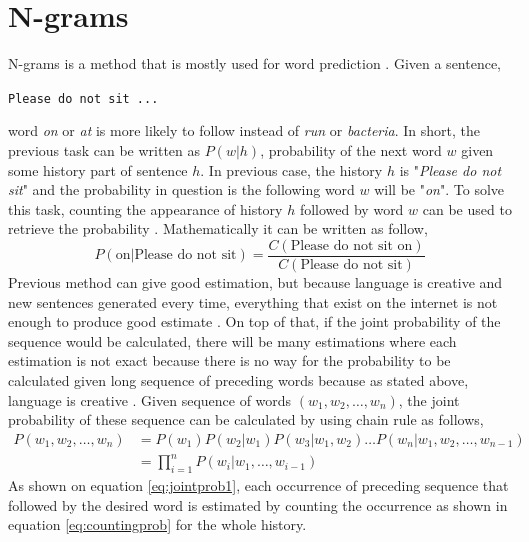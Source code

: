 \section{N-grams}
    N-grams is a method that is mostly used for word prediction
    \citep{speech2009Jurafsky:2009:SLP:1214993}. Given a sentence,
    \begin{center}
        \texttt{Please do not sit ...}
    \end{center}
    word \textit{on} or \textit{at} is more likely to follow instead
    of \textit{run} or \textit{bacteria}. In short, the previous task
    can be written as $P(w\vert h)$, probability of the next word $w$
    given some history part of sentence $h$. In previous case, the
    history $h$ is "\textit{Please do not sit}" and the probability in
    question is the following word $w$ will be "\textit{on}". To solve
    this task, counting the appearance of history $h$ followed by word
    $w$ can be used to retrieve the probability
    \citep{speech2009Jurafsky:2009:SLP:1214993}. Mathematically it can
    be written as follow,
    \begin{equation*}
        \label{eq:countingprob}
        P(\text{on} \vert \text{Please do not sit}) = 
        \frac{C(\text{Please do not sit on})}{C(\text{Please do not sit})}
    \end{equation*}
    Previous method can give good estimation, but because language is
    creative and new sentences generated every time, everything that
    exist on the internet is not enough to produce good estimate
    \citep{speech2009Jurafsky:2009:SLP:1214993}. On top of that, if
    the joint probability of the sequence would be calculated, there
    will be many estimations where each estimation is not exact
    because there is no way for the probability to be calculated given
    long sequence of preceding words because as stated above,
    language is creative
    \citep{speech2009Jurafsky:2009:SLP:1214993}. Given sequence of
    words $(w_1, w_2, \dots, w_n)$, the joint probability of these
    sequence can be calculated by using chain rule as follows,
    \begin{align}
        \label{eq:jointprob1}
        P(w_1, w_2, \dots, w_n) &= P(w_1)P(w_2 \vert w_1)P(w_3 \vert w_1, w_2) \dots
        P(w_n \vert w_1, w_2, \dots, w_{n-1}) \\
        \label{eq:jointprob2}
        &= \prod_{i=1}^n P(w_i \vert w_1, \dots, w_{i-1})
    \end{align}
    As shown on equation \ref{eq:jointprob1}, each occurrence of
    preceding sequence that followed by the desired word is estimated
    by counting the occurrence as shown in equation
    \ref{eq:countingprob} for the whole history.
    
